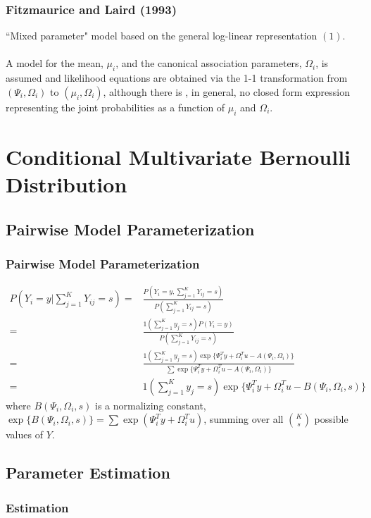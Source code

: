 \documentclass[]{beamer}
\newcommand\Fontvii{\fontsize{8}{8}\selectfont}
\begin{document}
\begin{frame}
\frametitle{Fitzmaurice and Laird (1993)}
``Mixed parameter" model based on the general log-linear representation $(1)$.\\
\ \\
A model for the mean, $\mu_i$, and the canonical association parameters, $\Omega_i$, is assumed and likelihood equations are obtained via the 1-1 transformation from 
$(\Psi_i, \Omega_i)$ to $(\mu_i, \Omega_i)$, although there is , in general, no closed form expression representing the joint probabilities as a function of $\mu_i$ and $\Omega_i$.
\end{frame}

%
%





\section{Conditional Multivariate Bernoulli Distribution}
\subsection{Pairwise Model Parameterization}

\begin{frame}
\frametitle{Pairwise Model Parameterization}
\Fontvii
\begin{align*}
P(Y_i=y|\sum_{j=1}^K Y_{ij} = s) = & \frac{P(Y_i=y,\sum_{j=1}^K Y_{ij} = s)}{P(\sum_{j=1}^K Y_{ij} = s)}\\
= & \frac{1(\sum_{j=1}^K y_j = s) P(Y_i=y)}{P(\sum_{j=1}^K Y_{ij} = s)} \\
= & \frac{1(\sum_{j=1}^K y_j = s)\exp \{\Psi_i^T y + \Omega_i^{T} u - A(\Psi_i,\Omega_i) \}}{\sum \exp \{\Psi_i^T y + \Omega_i^{T} u - A(\Psi_i,\Omega_i)\}}\\
= & 1(\sum_{j=1}^K y_j = s)\exp \{\Psi_i^T y + \Omega_i^{T} u - B(\Psi_i,\Omega_i,s) \}
\end{align*}
where $B(\Psi_i,\Omega_i, s)$ is a normalizing constant, $\exp \{B(\Psi_i,\Omega_i,s)\} = \sum \exp (\Psi_i^T y + \Omega_i^T u)$, summing over all ${K \choose s}$ possible values of $Y$.

\end{frame}

\subsection{Parameter Estimation}
\begin{frame}
\frametitle{Estimation}

\end{frame}
\end{document}
